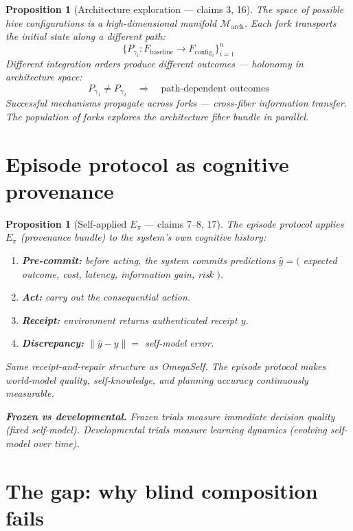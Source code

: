 \documentclass[11pt,a4paper]{article}
\newtheorem{proposition}[definition]{Proposition}
\begin{document}
\begin{proposition}[Architecture exploration --- claims 3, 16]
\label{prop:forks}
The space of possible hive configurations is a high-dimensional manifold
$\mathcal{M}_{\text{arch}}$. Each fork transports the initial state along
a different path:
\[
  \{P_{\gamma_i}: F_{\text{baseline}} \to F_{\text{config}_i}\}_{i=1}^n
\]
Different integration orders produce different outcomes --- holonomy in
architecture space:
\[
  P_{\gamma_1} \neq P_{\gamma_2} \quad \Longrightarrow \quad
    \text{path-dependent outcomes}
\]
Successful mechanisms propagate across forks --- cross-fiber information
transfer. The population of forks explores the architecture fiber bundle
in parallel.
\end{proposition}

\section{Episode protocol as cognitive provenance}

\begin{proposition}[Self-applied $E_\pi$ --- claims 7--8, 17]
\label{prop:episode}
The episode protocol applies $E_\pi$ (provenance bundle) to the system's
own cognitive history:
\begin{enumerate}
  \item \textbf{Pre-commit:} before acting, the system commits predictions
    $\hat{y} = ($ expected outcome, cost, latency, information gain,
    risk $)$.
  \item \textbf{Act:} carry out the consequential action.
  \item \textbf{Receipt:} environment returns authenticated receipt $y$.
  \item \textbf{Discrepancy:} $\|\hat{y} - y\| = $ self-model error.
\end{enumerate}
Same receipt-and-repair structure as OmegaSelf. The episode protocol
makes world-model quality, self-knowledge, and planning accuracy
continuously measurable.

\textbf{Frozen vs developmental.} Frozen trials measure immediate
decision quality (fixed self-model). Developmental trials measure
learning dynamics (evolving self-model over time).
\end{proposition}


\section{The gap: why blind composition fails}
\label{sec:gap}
\end{document}
